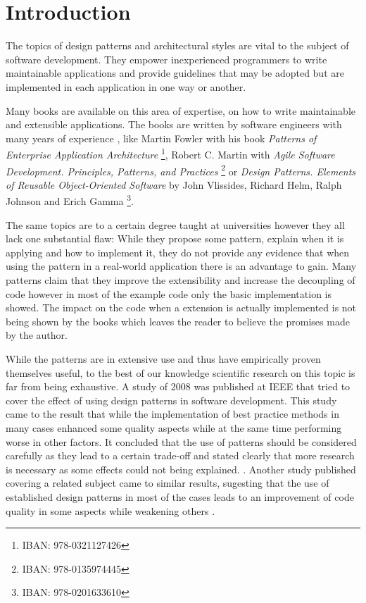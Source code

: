 \chapter{Introduction}

The topics of design patterns and architectural styles are vital to the subject of software development. They empower inexperienced programmers to write maintainable applications and provide guidelines that may be adopted but are implemented in each application in one way or another. 

Many books are available on this area of expertise, on how to write maintainable and extensible applications. The books are written by software engineers with many years of experience , like Martin Fowler with his book \emph{Patterns of Enterprise Application Architecture} \footnote{IBAN: 978-0321127426}, Robert C. Martin with \emph{Agile Software Development. Principles, Patterns, and Practices} \footnote{IBAN: 978-0135974445} or \emph{Design Patterns. Elements of Reusable Object-Oriented Software} by John Vlissides, Richard Helm, Ralph Johnson and Erich Gamma \footnote{IBAN: 978-0201633610}. 

The same topics are to a certain degree taught at universities however they all lack one substantial flaw: While they propose some pattern, explain when it is applying and how to implement it, they do not provide any evidence that when using the pattern in a real-world application there is an advantage to gain.  Many patterns claim that they improve the extensibility and increase the decoupling of code however in most of the example code only the basic implementation is showed. The impact on the code when a extension is actually implemented is not being shown by the books which leaves the reader to believe the promises made by the author. 


While the patterns are in extensive use and thus have empirically proven themselves useful, to the best of our knowledge scientific research on this topic is far from being exhaustive. A study of 2008 was published at IEEE that tried to cover the effect of using design patterns in software development. This study came to the result that while the implementation of best practice methods in many cases enhanced some quality aspects while at the same time performing worse in other factors. It concluded that the use of patterns should be considered carefully as they lead to a certain trade-off and stated clearly that more research is necessary as some effects could not being explained. \cite{quality}.
Another study published covering a related subject came to similar results, sugesting that the use of established design patterns in most of the cases leads to an improvement of code quality in some aspects while weakening others \cite{quality2}.

